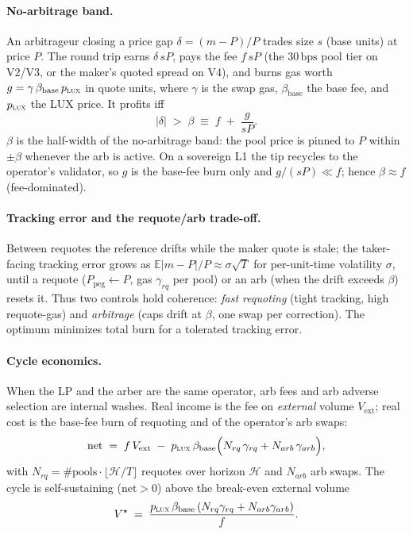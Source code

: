 \documentclass[11pt,a4paper]{article}
\newcommand{\bps}{\,\text{bps}}
\begin{document}
\paragraph{No-arbitrage band.} An arbitrageur closing a price gap $\delta = (m-P)/P$
trades size $s$ (base units) at price $P$. The round trip earns $\delta\, s P$, pays the
fee $f\, s P$ (the $30\bps$ pool tier on V2/V3, or the maker's quoted spread on V4), and
burns gas worth $g = \gamma\,\beta_{\text{base}}\,p_{\textsc{lux}}$ in quote units,
where $\gamma$ is the swap gas, $\beta_{\text{base}}$ the base fee, and $p_{\textsc{lux}}$
the LUX price. It profits iff
\begin{equation}\label{eq:band}
|\delta| \;>\; \beta \;\equiv\; f \;+\; \frac{g}{sP}.
\end{equation}
$\beta$ is the half-width of the no-arbitrage band: the pool price is pinned to $P$
within $\pm\beta$ whenever the arb is active. On a sovereign L1 the tip recycles to the
operator's validator, so $g$ is the base-fee burn only and $g/(sP)\!\ll\!f$; hence
$\beta\!\approx\!f$ (fee-dominated).

\paragraph{Tracking error and the requote/arb trade-off.} Between requotes the reference
drifts while the maker quote is stale; the taker-facing tracking error grows as
$\mathbb{E}|m-P|/P \approx \sigma\sqrt{T}$ for per-unit-time volatility $\sigma$, until a
requote ($P_{\text{peg}}\!\leftarrow\!P$, gas $\gamma_{rq}$ per pool) or an arb (when the
drift exceeds $\beta$) resets it. Thus two controls hold coherence: \emph{fast requoting}
(tight tracking, high requote-gas) and \emph{arbitrage} (caps drift at $\beta$, one swap
per correction). The optimum minimizes total burn for a tolerated tracking error.

\paragraph{Cycle economics.} When the LP and the arber are the same operator, arb fees and arb
adverse selection are internal washes. Real income is the fee on \emph{external} volume
$V_{\text{ext}}$; real cost is the base-fee burn of requoting and of the operator's arb swaps:
\begin{equation}\label{eq:econ}
\text{net} \;=\; f\,V_{\text{ext}} \;-\; p_{\textsc{lux}}\,\beta_{\text{base}}
\Big( N_{rq}\,\gamma_{rq} + N_{arb}\,\gamma_{arb}\Big),
\end{equation}
with $N_{rq}=\#\text{pools}\cdot \lfloor \mathcal{H}/T\rfloor$ requotes over horizon
$\mathcal{H}$ and $N_{arb}$ arb swaps. The cycle is self-sustaining ($\text{net}>0$)
above the break-even external volume
\begin{equation}\label{eq:breakeven}
V^\star \;=\; \frac{p_{\textsc{lux}}\,\beta_{\text{base}}\,(N_{rq}\gamma_{rq}+N_{arb}\gamma_{arb})}{f}.
\end{equation}
\end{document}
